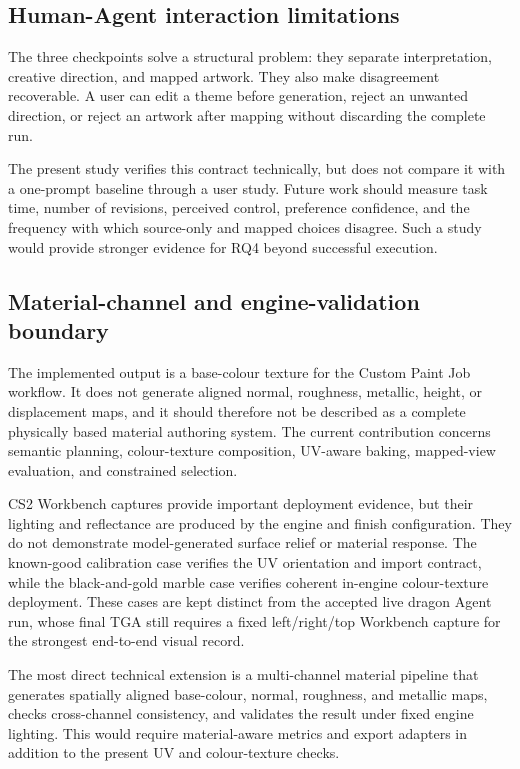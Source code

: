\subsection{Human-Agent interaction limitations}

The three checkpoints solve a structural problem: they separate interpretation,
creative direction, and mapped artwork. They also make disagreement recoverable.
A user can edit a theme before generation, reject an unwanted direction, or reject
an artwork after mapping without discarding the complete run.

The present study verifies this contract technically, but does not compare it with
a one-prompt baseline through a user study. Future work should measure task time,
number of revisions, perceived control, preference confidence, and the frequency
with which source-only and mapped choices disagree. Such a study would provide
stronger evidence for RQ4 beyond successful execution.

\subsection{Material-channel and engine-validation boundary}

The implemented output is a base-colour texture for the Custom Paint Job
workflow. It does not generate aligned normal, roughness, metallic, height, or
displacement maps, and it should therefore not be described as a complete
physically based material authoring system. The current contribution concerns
semantic planning, colour-texture composition, UV-aware baking, mapped-view
evaluation, and constrained selection.

CS2 Workbench captures provide important deployment evidence, but their lighting
and reflectance are produced by the engine and finish configuration. They do not
demonstrate model-generated surface relief or material response. The known-good
calibration case verifies the UV orientation and import contract, while the
black-and-gold marble case verifies coherent in-engine colour-texture deployment.
These cases are kept distinct from the accepted live dragon Agent run, whose
final TGA still requires a fixed left/right/top Workbench capture for the strongest
end-to-end visual record.

The most direct technical extension is a multi-channel material pipeline that
generates spatially aligned base-colour, normal, roughness, and metallic maps,
checks cross-channel consistency, and validates the result under fixed engine
lighting. This would require material-aware metrics and export adapters in
addition to the present UV and colour-texture checks.

